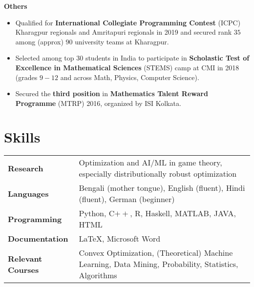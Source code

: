 \vspace{\mygap}
\resumeProjectHeading
{\textbf{Others}}
{}
{
\item 
\begin{itemize}[itemsep=-4pt, parsep=5pt, leftmargin=0.5cm]
\item {}  Qualified for \textbf{International Collegiate Programming Contest} (ICPC) Kharagpur regionals and Amritapuri regionals in 2019 and secured rank $35$ among (approx) $90$ university teams at Kharagpur.
\item Selected among top $30$ students in India to participate in \textbf{Scholastic Test of Excellence in Mathematical Sciences} (STEMS) camp at CMI in 2018 (grades $9-12$ and across Math, Physics, Computer Science).
\item Secured the \textbf{third position} in \textbf{Mathematics Talent Reward Programme} (MTRP) 2016, organized by ISI Kolkata.\end{itemize}}
\resumeSubHeadingListEnd
\vspace{-20pt}


\section{Skills}

\begin{tabular*}{\textwidth}{l @{\hskip 0.5in} l}
\textbf{Research} & Optimization and AI/ML in game theory, especially distributionally robust optimization\\
\textbf{Languages} & Bengali (mother tongue), English (fluent), Hindi (fluent), German (beginner)\\
\textbf{Programming}  & {Python, C$++$, R, Haskell,  MATLAB, JAVA, HTML} \\
\textbf {Documentation} & {\LaTeX, Microsoft Word} \\
\textbf{Relevant Courses}  & {Convex Optimization, (Theoretical) Machine Learning, Data Mining, Probability, Statistics, Algorithms} \\
\end{tabular*}
\vspace{-15pt}







